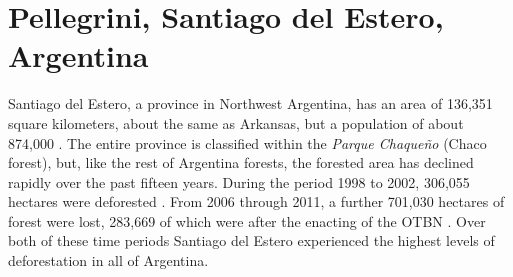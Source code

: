 \section{Pellegrini, Santiago del Estero, Argentina}
\label{chapter:studyareas:pellegrini}

Santiago del Estero, a province in Northwest Argentina, has an area of 136,351 square kilometers, about the same as Arkansas, but a population of about 874,000 \autocite{estadistica-y-c2010a}. The entire province is classified within the \textit{Parque Chaqueño} (Chaco forest), but, like the rest of Argentina forests, the forested area has declined rapidly over the past fifteen years. During the period 1998 to 2002, 306,055 hectares were deforested \autocite{secretaria-de-a2007informe}. From 2006 through 2011, a further 701,030 hectares of forest were lost, 283,669 of which were after the enacting of the OTBN \autocite{secreteria-de-a2012monitoreo}. Over both of these time periods Santiago del Estero experienced the highest levels of deforestation in all of Argentina.

